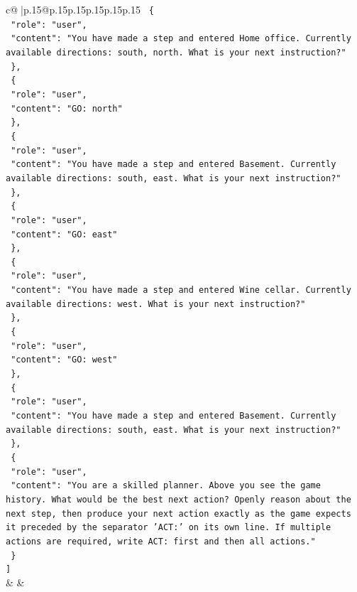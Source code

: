 \documentclass{article}
\begin{document}
{\begin{supertabular}{c@{$\;$}|p{.15\linewidth}@{}p{.15\linewidth}p{.15\linewidth}p{.15\linewidth}p{.15\linewidth}p{.15\linewidth}}
{{{\texttt{  \{} \\
\texttt{    "role": "user",} \\
\texttt{    "content": "You have made a step and entered Home office. Currently available directions: south, north. What is your next instruction?"} \\
\texttt{  \},} \\
\texttt{  \{} \\
\texttt{    "role": "user",} \\
\texttt{    "content": "GO: north"} \\
\texttt{  \},} \\
\texttt{  \{} \\
\texttt{    "role": "user",} \\
\texttt{    "content": "You have made a step and entered Basement. Currently available directions: south, east. What is your next instruction?"} \\
\texttt{  \},} \\
\texttt{  \{} \\
\texttt{    "role": "user",} \\
\texttt{    "content": "GO: east"} \\
\texttt{  \},} \\
\texttt{  \{} \\
\texttt{    "role": "user",} \\
\texttt{    "content": "You have made a step and entered Wine cellar. Currently available directions: west. What is your next instruction?"} \\
\texttt{  \},} \\
\texttt{  \{} \\
\texttt{    "role": "user",} \\
\texttt{    "content": "GO: west"} \\
\texttt{  \},} \\
\texttt{  \{} \\
\texttt{    "role": "user",} \\
\texttt{    "content": "You have made a step and entered Basement. Currently available directions: south, east. What is your next instruction?"} \\
\texttt{  \},} \\
\texttt{  \{} \\
\texttt{    "role": "user",} \\
\texttt{    "content": "You are a skilled planner. Above you see the game history. What would be the best next action? Openly reason about the next step, then produce your next action exactly as the game expects it preceded by the separator 'ACT:' on its own line. If multiple actions are required, write ACT: first and then all actions."} \\
\texttt{  \}} \\
\texttt{{]}} \\
            }
        }
    }
    & & \\ \\


\end{supertabular}}
\end{document}
